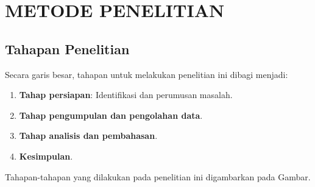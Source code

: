 \chapter{METODE PENELITIAN}

\section{Tahapan Penelitian}

Secara garis besar, tahapan untuk melakukan penelitian ini dibagi menjadi:

\begin{enumerate}
    \item \textbf{Tahap persiapan}: Identifikasi dan perumusan masalah.
    \item \textbf{Tahap pengumpulan dan pengolahan data}.
    \item \textbf{Tahap analisis dan pembahasan}.
    \item \textbf{Kesimpulan}.
\end{enumerate}

Tahapan-tahapan yang dilakukan pada penelitian ini digambarkan pada Gambar.

